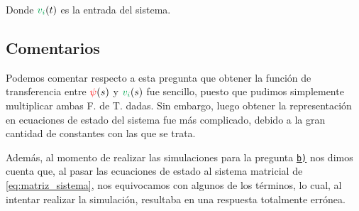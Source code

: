 Donde $\verd{v_{i}} (t)$ es la entrada del sistema.

\subsection{Comentarios}

Podemos comentar respecto a esta pregunta que obtener la función de transferencia
entre $\mathbin{\color{red}\psi}(s)$ y $\verd{v_{i}}(s)$ fue sencillo, puesto que pudimos
simplemente multiplicar ambas F. de T. dadas. Sin embargo, luego obtener la
representación en ecuaciones de estado del sistema fue más complicado, debido
a la gran cantidad de constantes con las que se trata.

Además, al momento de realizar las simulaciones para la pregunta \hyperref[pregunta-b]{\texttt{b)}}
nos dimos cuenta que, al pasar las ecuaciones de estado al sistema matricial de
\eqref{eq:matriz_sistema}, nos equivocamos con algunos de los términos, lo cual,
al intentar realizar la simulación, resultaba en una respuesta totalmente errónea.

\FloatBarrier
\newpage
